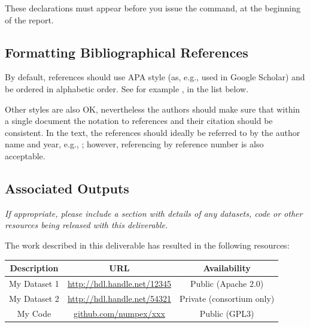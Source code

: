 These declarations must appear before you issue the  command, at the beginning of the report.

\subsection{Formatting Bibliographical References}
\label{sec:formatting-bibliographical-references}

By default, references should use APA style (as, e.g., used in Google Scholar) and be ordered in alphabetic order. See for example \cite{bib:tan2004}, in the list below.

Other styles are also OK, nevertheless the authors should make sure that within a single document the notation to references and their citation should be consistent. In the text, the references should ideally be referred to by the author name and year, e.g., \cite{bib:lamport1994}; however, referencing by reference number is also acceptable.

\subsection{Associated Outputs}
\label{sec:associated-outputs}

\textit{If appropriate, please include a section with details of any datasets, code or other resources being released with this deliverable.}

The work described in this deliverable has resulted in the following resources:

\begin{center}
    \def\arraystretch{1.25}		
    \begin{tabular}{|c|c|c|}
        \hline
        \rowcolor{numpexgray}
        \color{white} Description & 
        \color{white} URL & 
        \color{white} Availability 
        \\\hline
    
        \rowcolor{white}\color{numpexfont} 
        My Dataset 1 &  
        \url{http://hdl.handle.net/12345} &
        Public (Apache 2.0) \\
    
        \rowcolor{numpexlightergray}\color{numpexfont} 
        My Dataset 2 &  
        \url{http://hdl.handle.net/54321} &
        Private (consortium only) \\
    
        \rowcolor{white}\color{numpexfont} 
        My Code &  
        \url{github.com/numpex/xxx} &
        Public (GPL3) \\
    
        \hline
    \end{tabular}
\end{center}

